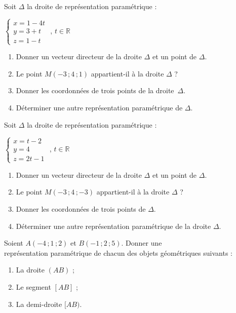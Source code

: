 \documentclass{cornouaille}
\begin{document}
\begin{colonne*exercice}
\begin{exercice}\label{ex49G2}
  Soit $\Delta$ la droite de représentation paramétrique :
{\centering
  $\begin{cases}x=1-4t \\y=3+t \\z=1-t \end{cases}$ , $t\in\mathbb{R}$
\par\vspace{-.5\baselineskip}}
\begin{enumerate}
\item Donner un vecteur directeur de la droite $\Delta$ et un point de
  $\Delta$.
\item Le point $M(-3\,;4\,;1)$ appartient-il à la droite $\Delta$ ?
\item Donner les coordonnées de trois points de la droite~$\Delta$.
\item Déterminer une autre représentation paramétrique de $\Delta$.
\end{enumerate}
\end{exercice}

\begin{exercice}
  Soit  $\Delta$ la droite de représentation paramétrique :

  \begin{center}
    $\begin{cases}x=t-2 \\y=4 \\z=2t-1 \end{cases}$ , $t\in\mathbb{R}$
  \end{center}

  \begin{enumerate}
  \item Donner un vecteur directeur de la droite $\Delta$ et un point
    de $\Delta$.
  \item Le point $M(-3\,;4\,;-3)$ appartient-il à la droite $\Delta$ ?
  \item Donner les coordonnées de trois points de $\Delta$.
  \item Déterminer une autre représentation paramétrique de la droite
    $\Delta$.
  \end{enumerate}
\end{exercice}

\begin{exercice}
  Soient $A(-4\,;1\,;2)$ et $B(-1\,;2\,;5)$. Donner une\\
  représentation paramétrique de chacun des objets géométriques
  suivants :
  \begin{enumerate}
  \item La droite $(AB)$ ;
  \item Le segment $[AB]$ ;
  \item La demi-droite $[AB)$.
  \end{enumerate}
\end{exercice}


\end{colonne*exercice}
\end{document}
